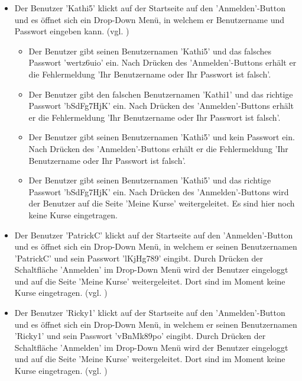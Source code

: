 \documentclass[a4paper]{scrreprt}
\begin{document}
\begin{itemize}
			
			\item {} 
			Der Benutzer 'Kathi5' klickt auf der Startseite	auf den 'Anmelden'-Button und es öffnet sich ein Drop-Down Menü, in welchem er Benutzername und Passwort eingeben kann. (vgl. )
			\begin{itemize}
				\item Der Benutzer gibt seinen Benutzernamen 'Kathi5' und das falsches Passwort 'wertz6uio' ein. Nach Drücken des 'Anmelden'-Buttons erhält er die Fehlermeldung 'Ihr Benutzername oder Ihr Passwort ist falsch'.
				\item Der Benutzer gibt den falschen Benutzernamen 'Kathi1' und das richtige Passwort 'bSdFg7HjK' ein. Nach Drücken des 'Anmelden'-Buttons erhält er die Fehlermeldung 'Ihr Benutzername oder Ihr Passwort ist falsch'.
				\item Der Benutzer gibt seinen Benutzernamen 'Kathi5' und kein Passwort ein. Nach Drücken des 'Anmelden'-Buttons erhält er die Fehlermeldung 'Ihr Benutzername oder Ihr Passwort ist falsch'.
				\item Der Benutzer gibt seinen Benutzernamen 'Kathi5' und das richtige Passwort 'bSdFg7HjK' ein. Nach Drücken des 'Anmelden'-Buttons wird der Benutzer auf die Seite 'Meine Kurse' weitergeleitet. Es sind hier noch keine Kurse eingetragen.
			\end{itemize} 
			
			\item {} 
			Der Benutzer 'PatrickC' klickt auf der Startseite	auf den 'Anmelden'-Button und es öffnet sich ein Drop-Down Menü, in welchem er seinen Benutzernamen 'PatrickC' und sein Passwort 'lKjHg789' eingibt. Durch Drücken der Schaltfläche 'Anmelden' im Drop-Down Menü wird der Benutzer eingeloggt und auf die Seite 'Meine Kurse' weitergeleitet. Dort sind im Moment keine Kurse eingetragen. (vgl. )
			
			\item {} 
			Der Benutzer 'Ricky1' klickt auf der Startseite	auf den 'Anmelden'-Button und es öffnet sich ein Drop-Down Menü, in welchem er seinen Benutzernamen 'Ricky1' und sein Passwort 'vBnMk89po' eingibt. Durch Drücken der Schaltfläche 'Anmelden' im Drop-Down Menü wird der Benutzer eingeloggt und auf die Seite 'Meine Kurse' weitergeleitet. Dort sind im Moment keine Kurse eingetragen. (vgl. )
				

\end{itemize}
\end{document}
